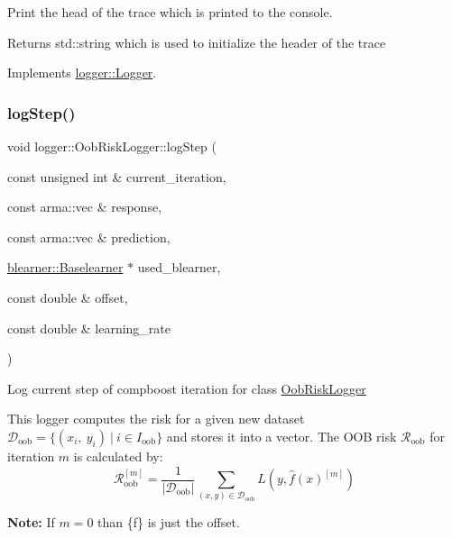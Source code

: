 Print the head of the trace which is printed to the console. 

\begin{DoxyReturn}{Returns}
{\ttfamily std\+::string} which is used to initialize the header of the trace 
\end{DoxyReturn}


Implements \mbox{\hyperlink{classlogger_1_1_logger_a825f96e8564ac4013ff09ef842c0aeec}{logger\+::\+Logger}}.

\mbox{\label{classlogger_1_1_oob_risk_logger_a948a89f02ac782c25a15c49c4a108c02}} 
\subsubsection{\texorpdfstring{log\+Step()}{logStep()}}
{\footnotesize\ttfamily void logger\+::\+Oob\+Risk\+Logger\+::log\+Step (\begin{DoxyParamCaption}\item[{const unsigned int \&}]{current\+\_\+iteration,  }\item[{const arma\+::vec \&}]{response,  }\item[{const arma\+::vec \&}]{prediction,  }\item[{\mbox{\hyperlink{classblearner_1_1_baselearner}{blearner\+::\+Baselearner}} $\ast$}]{used\+\_\+blearner,  }\item[{const double \&}]{offset,  }\item[{const double \&}]{learning\+\_\+rate }\end{DoxyParamCaption})\hspace{0.3cm}{\ttfamily [virtual]}}



Log current step of compboost iteration for class {\ttfamily \mbox{\hyperlink{classlogger_1_1_oob_risk_logger}{Oob\+Risk\+Logger}}} 

This logger computes the risk for a given new dataset $\mathcal{D}_\mathrm{oob} = \{(x_i,\ y_i)\ |\ i \in I_\mathrm{oob}\}$ and stores it into a vector. The O\+OB risk $\mathcal{R}_\mathrm{oob}$ for iteration $m$ is calculated by\+: \[ \mathcal{R}_\mathrm{oob}^{[m]} = \frac{1}{|\mathcal{D}_\mathrm{oob}|}\sum\limits_{(x,y) \in \mathcal{D}_\mathrm{oob}} L(y, \hat{f}(x)^{[m]}) \]

{\bfseries Note\+:} If $m=0$ than \{f\} is just the offset.


